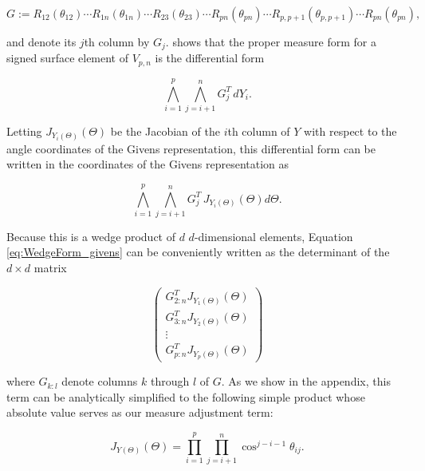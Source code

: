 \documentclass[ba]{imsart}
\numberwithin{equation}{section}
\theoremstyle{plain}
\begin{document}
\begin{equation}
G := R_{12}(\theta_{12}) \cdots R_{1n}(\theta_{1n})  \cdots R_{23}(\theta_{23}) \cdots R_{pn}(\theta_{pn}) \cdots R_{p,p+1}(\theta_{p,p+1}) \cdots R_{pn}(\theta_{pn}),
\end{equation}

\noindent and denote its $j$th column by $G_j$. \cite{muirhead2009aspects} shows that the proper measure form for a signed surface element of $V_{p,n}$ is the differential form

\begin{equation}
\label{eq:WedgeForm}
\bigwedge_{i=1}^p \bigwedge_{j=i+1}^n G_j^T\, dY_i.
\end{equation}

\noindent Letting $J_{Y_i(\Theta)}(\Theta)$ be the Jacobian of the $i$th column of $Y$ with respect to the angle coordinates of the Givens representation, this differential form can be written in the coordinates of the Givens representation as

\begin{equation}
\label{eq:WedgeForm_givens}
\bigwedge_{i=1}^p \bigwedge_{j=i+1}^n G_j^T\, J_{Y_i(\Theta)}(\Theta) d\Theta.
\end{equation}

\noindent Because this is a wedge product of $d$ $d$-dimensional elements, Equation \ref{eq:WedgeForm_givens} can be conveniently written as the determinant of the $d \times d$ matrix

\begin{equation}
\label{eq:measure_matrix_form}
\begin{pmatrix}
G_{2:n}^T J_{Y_1(\Theta)}(\Theta)\\
G_{3:n}^T J_{Y_2(\Theta)}(\Theta)\\
\vdots\\
G_{p:n}^T J_{Y_p(\Theta)}(\Theta)
\end{pmatrix}
\end{equation}

\noindent where $G_{k:l}$ denote columns $k$ through $l$ of $G$. As we show in the appendix, this term can be analytically simplified to the following simple product whose absolute value serves as our measure adjustment term:

\begin{equation}
\label{eq:final_change_of_measure}
J_{Y(\Theta)}(\Theta) = \prod_{i=1}^p \prod_{j=i+1}^n \cos^{j-i-1} \theta_{ij}.
\end{equation}

\end{document}
